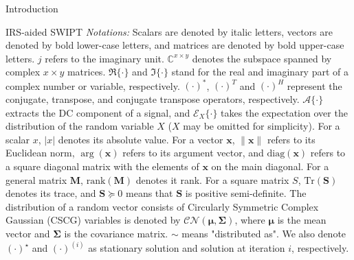 \documentclass[journal]{IEEEtran}
\begin{document}
\begin{section}{Introduction}
\begin{subsection}{IRS-aided SWIPT}
			\textit{Notations:} Scalars are denoted by italic letters, vectors are denoted by bold lower-case letters, and matrices are denoted by bold upper-case letters. $j$ refers to the imaginary unit. $\mathbb{C}^{x \times y}$ denotes the subspace spanned by complex $x \times y$ matrices. $\Re\{\cdot\}$ and $\Im\{\cdot\}$ stand for the real and imaginary part of a complex number or variable, respectively. $(\cdot)^*$, $(\cdot)^T$ and $(\cdot)^H$ represent the conjugate, transpose, and conjugate transpose operators, respectively. $\mathcal{A}\{\cdot\}$ extracts the DC component of a signal, and $\mathcal{E}_X\{\cdot\}$ takes the expectation over the distribution of the random variable $X$ ($X$ may be omitted for simplicity). For a scalar $x$, $\lvert{x}\rvert$ denotes its absolute value. For a vector $\boldsymbol{x}$, $\lVert{\boldsymbol{x}}\rVert$ refers to its Euclidean norm, $\arg(\boldsymbol{x})$ refers to its argument vector, and $\mathrm{diag}(\boldsymbol{x})$ refers to a square diagonal matrix with the elements of $\boldsymbol{x}$ on the main diagonal. For a general matrix $\boldsymbol{M}$, $\mathrm{rank}(\boldsymbol{M})$ denotes it rank. For a square matrix $S$, $\mathrm{Tr}(\boldsymbol{S})$ denotes its trace, and $\boldsymbol{S} \succeq 0$ means that $\boldsymbol{S}$ is positive semi-definite. The distribution of a random vector consists of Circularly Symmetric Complex Gaussian (CSCG) variables is denoted by $\mathcal{CN}(\boldsymbol{\mu},\boldsymbol{\Sigma})$, where $\boldsymbol{\mu}$ is the mean vector and $\boldsymbol{\Sigma}$ is the covariance matrix. $\sim$ means "distributed as". We also denote $(\cdot)^{\star}$ and $(\cdot)^{(i)}$ as stationary solution and solution at iteration $i$, respectively.
		\end{subsection}
	\end{section}
\end{document}
